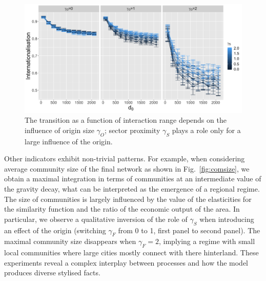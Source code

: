 \documentclass[10pt,letterpaper]{article}
\begin{document}
\begin{figure}
    \includegraphics[width=\linewidth]{figures/Fig5.png}
    \caption{The transition as a function of interaction range depends on the influence of origin size $\gamma_O$; sector proximity $\gamma_S$ plays a role only for a large influence of the origin.\label{fig:fig5}}
\end{figure}


Other indicators exhibit non-trivial patterns. For example, when considering average community size of the final network as shown in Fig.~\ref{fig:comsize}, we obtain a maximal integration in terms of communities at an intermediate value of the gravity decay, what can be interpreted as the emergence of a regional regime. The size of communities is largely influenced by the value of the elasticities for the similarity function and the ratio of the economic output of the area. In particular, we observe a qualitative inversion of the role of $\gamma_S$ when introducing an effect of the origin (switching $\gamma_F$ from 0 to 1, first panel to second panel). The maximal community size disappears when $\gamma_F = 2$, implying a regime with small local communities where large cities mostly connect with there hinterland. These experiments reveal a complex interplay between processes and how the model produces diverse stylised facts.
\end{document}
